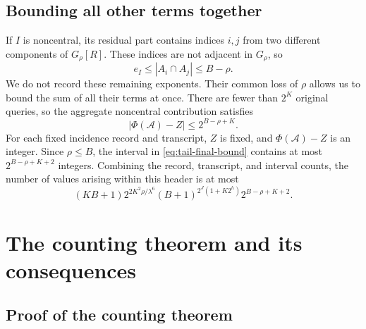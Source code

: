 \documentclass[11pt]{article}
\theoremstyle{definition}
\theoremstyle{remark}
\begin{document}
\subsection{Bounding all other terms together}

If $I$ is noncentral, its residual part contains indices $i,j$ from two
different components of $G_\rho[R]$. These indices are not adjacent in
$G_\rho$, so
\[
  e_I\le|A_i\cap A_j|\le B-\rho.
\]
We do not record these remaining exponents. Their common loss of $\rho$
allows us to bound the sum of all their terms at once. There are fewer than
$2^K$ original queries, so the aggregate noncentral contribution satisfies
\begin{equation}
  \left|\Phi(\mathcal A)-Z\right|
  \le2^{B-\rho+K}.
  \label{eq:tail-final-bound}
\end{equation}
For each fixed incidence record and transcript, $Z$ is fixed, and
$\Phi(\mathcal A)-Z$ is an integer. Since $\rho\le B$, the interval in
\eqref{eq:tail-final-bound} contains at most $2^{B-\rho+K+2}$ integers.
Combining the record, transcript, and interval counts, the number of values
arising within this header is at most
\begin{equation}
  (KB+1)2^{2K^2\rho/\lambda^6}
  (B+1)^{2^J(1+K2^h)}
  2^{B-\rho+K+2}.
  \label{eq:fixed-header-count}
\end{equation}

\section{The counting theorem and its consequences}\label{sec:lower-consequences}

\subsection{Proof of the counting theorem}
\end{document}
